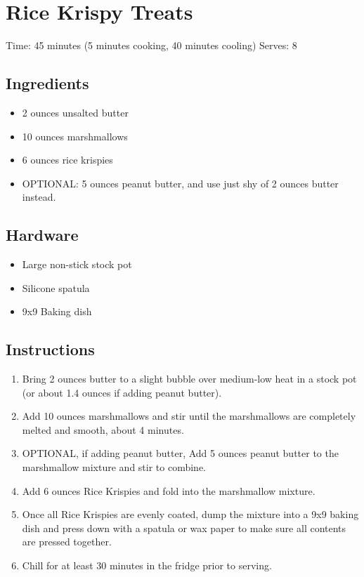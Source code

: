 \section{Rice Krispy Treats}
\label{riceKrispyTreats}
\setcounter{secnumdepth}{0}
Time: 45 minutes (5 minutes cooking, 40 minutes cooling)
Serves: 8

\begin{multicols}{2}
\subsection*{Ingredients}
\begin{itemize}
    \item 2 ounces unsalted butter
    \item 10 ounces marshmallows
    \item 6 ounces rice krispies
    \item OPTIONAL: 5 ounces peanut butter, and use just shy of 2 ounces butter instead. 
\end{itemize}

\subsection*{Hardware}
\begin{itemize}
    \item Large non-stick stock pot
    \item Silicone spatula
    \item 9x9 Baking dish
\end{itemize}
\clearpage

\subsection*{Instructions}
\begin{enumerate}
    \item Bring 2 ounces butter to a slight bubble over medium-low heat in a stock pot (or about 1.4 ounces if adding peanut butter).
    \item Add 10 ounces marshmallows and stir until the marshmallows are completely melted and smooth, about 4 minutes.
    \item OPTIONAL, if adding peanut butter, Add 5 ounces peanut butter to the marshmallow mixture and stir to combine.
    \item Add 6 ounces Rice Krispies and fold into the marshmallow mixture.
    \item Once all Rice Krispies are evenly coated, dump the mixture into a 9x9 baking dish and press down with a spatula or wax paper to make sure all contents are pressed together.
    \item Chill for at least 30 minutes in the fridge prior to serving.
\end{enumerate}


\end{multicols}
